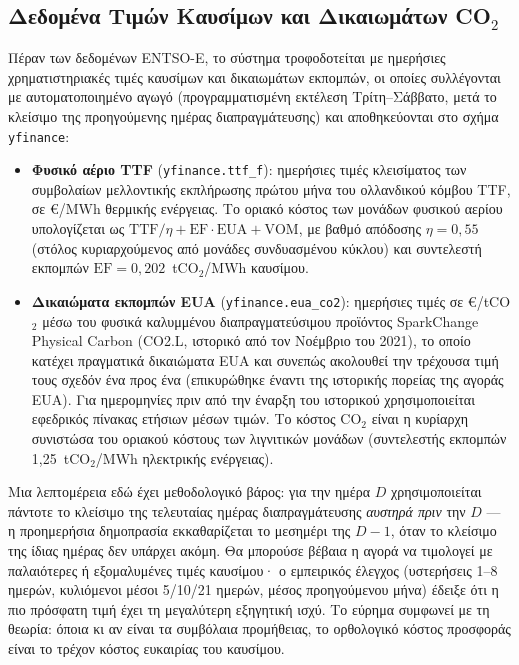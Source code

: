 \subsection{Δεδομένα Τιμών Καυσίμων και Δικαιωμάτων CO$_2$}
\label{subsec:fuel-price-data}

Πέραν των δεδομένων ENTSO-E, το σύστημα τροφοδοτείται με ημερήσιες χρηματιστηριακές τιμές καυσίμων και δικαιωμάτων εκπομπών, οι οποίες συλλέγονται με αυτοματοποιημένο αγωγό (προγραμματισμένη εκτέλεση Τρίτη--Σάββατο, μετά το κλείσιμο της προηγούμενης ημέρας διαπραγμάτευσης) και αποθηκεύονται στο σχήμα \texttt{yfinance}:

\begin{itemize}
\item \textbf{Φυσικό αέριο TTF} (\texttt{yfinance.ttf\_f}): ημερήσιες τιμές κλεισίματος των συμβολαίων μελλοντικής εκπλήρωσης πρώτου μήνα του ολλανδικού κόμβου TTF, σε €/MWh θερμικής ενέργειας. Το οριακό κόστος των μονάδων φυσικού αερίου υπολογίζεται ως $\text{TTF}/\eta + \text{EF} \cdot \text{EUA} + \text{VOM}$, με βαθμό απόδοσης $\eta = 0{,}55$ (στόλος κυριαρχούμενος από μονάδες συνδυασμένου κύκλου) και συντελεστή εκπομπών $\text{EF} = 0{,}202$~tCO$_2$/MWh καυσίμου.
\item \textbf{Δικαιώματα εκπομπών EUA} (\texttt{yfinance.eua\_co2}): ημερήσιες τιμές σε €/tCO$_2$ μέσω του φυσικά καλυμμένου διαπραγματεύσιμου προϊόντος SparkChange Physical Carbon (CO2.L, ιστορικό από τον Νοέμβριο του 2021), το οποίο κατέχει πραγματικά δικαιώματα EUA και συνεπώς ακολουθεί την τρέχουσα τιμή τους σχεδόν ένα προς ένα (επικυρώθηκε έναντι της ιστορικής πορείας της αγοράς EUA). Για ημερομηνίες πριν από την έναρξη του ιστορικού χρησιμοποιείται εφεδρικός πίνακας ετήσιων μέσων τιμών. Το κόστος CO$_2$ είναι η κυρίαρχη συνιστώσα του οριακού κόστους των λιγνιτικών μονάδων (συντελεστής εκπομπών 1,25~tCO$_2$/MWh ηλεκτρικής ενέργειας).
\end{itemize}

Μια λεπτομέρεια εδώ έχει μεθοδολογικό βάρος: για την ημέρα $D$ χρησιμοποιείται πάντοτε το κλείσιμο της τελευταίας ημέρας διαπραγμάτευσης \emph{αυστηρά πριν} την $D$ --- η προημερήσια δημοπρασία εκκαθαρίζεται το μεσημέρι της $D-1$, όταν το κλείσιμο της ίδιας ημέρας δεν υπάρχει ακόμη. Θα μπορούσε βέβαια η αγορά να τιμολογεί με παλαιότερες ή εξομαλυμένες τιμές καυσίμου· ο εμπειρικός έλεγχος (υστερήσεις 1--8 ημερών, κυλιόμενοι μέσοι 5/10/21 ημερών, μέσος προηγούμενου μήνα) έδειξε ότι η πιο πρόσφατη τιμή έχει τη μεγαλύτερη εξηγητική ισχύ. Το εύρημα συμφωνεί με τη θεωρία: όποια κι αν είναι τα συμβόλαια προμήθειας, το ορθολογικό κόστος προσφοράς είναι το τρέχον κόστος ευκαιρίας του καυσίμου.

